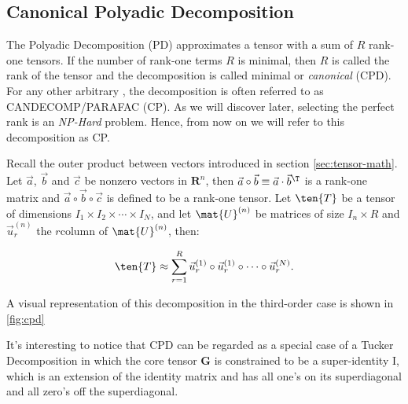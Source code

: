 \subsection{Canonical Polyadic Decomposition}
\begin{comment}
$\tensor{A} \otimes \tensor{B}$ denote the outer product between an $N\th$-order tensor $\tensor{A}$ and an $M\th$-order tensor $\tensor{B}$, then $\tensor{A} \otimes \tensor{B}$ is the $(N+M)\th$-order tensor defined by $(\tensor{A} \otimes \tensor{B})_{i_1\cdots i_N\,j_1\cdots j_M} = a_{i_1\cdots i_N} \cdot b_{j_1\cdots j_M}$. 
\end{comment}
The Polyadic Decomposition (PD) \parencite{tensor2009kolda} approximates a tensor with a sum of $R$ rank-one tensors. If the number of rank-one terms $R$ is minimal, then $R$ is called the rank of the tensor and the decomposition is called minimal or \emph{canonical} (CPD). \\
For any other arbitrary , the decomposition is often referred to as CANDECOMP/PARAFAC (CP). As we will discover later, selecting the perfect rank is an \emph{NP-Hard} problem. Hence, from now on we will refer to this decomposition as CP. \newline 

Recall the outer product between vectors introduced in section \ref{sec:tensor-math}.
Let $\vec{a}$, $\vec{b}$ and $\vec{c}$ be nonzero vectors in $\mathbf{R}^{n}$, then $\vec{a} \circ \vec{b} \equiv \vec{a}\cdot \vec{b}^{\T}$ is a rank-one matrix and
$\vec{a} \circ \vec{b} \circ \vec{c}$ is defined to be a rank-one tensor. Let $\ten{T}$ be a tensor of dimensions $I_1 \times I_2 \times \cdots
\times I_N$, and let $\mat{U}^{(n)}$ be matrices of size $I_n \times R$ and $\vec{u}_r^{(n)}$ the $r$\th column of $\mat{U}^{(n)}$,
then:

\begin{equation}
    \ten{T} \approx \sum_{r=1}^{R} \vec{u}^{(1)}_r \circ \vec{u}^{(1)}_r \circ
   \cdots \circ \vec{u}^{(N)}_r.
\end{equation} 

A visual representation of this decomposition in the third-order case is shown
in \ref{fig:cpd}

It's interesting to notice that CPD can be regarded as a special case of a Tucker Decomposition in which the core tensor $\mathbf{G}$ is constrained to be a super-identity I, which is an extension of the identity matrix and has all one's on its superdiagonal and all zero's off the superdiagonal. 




